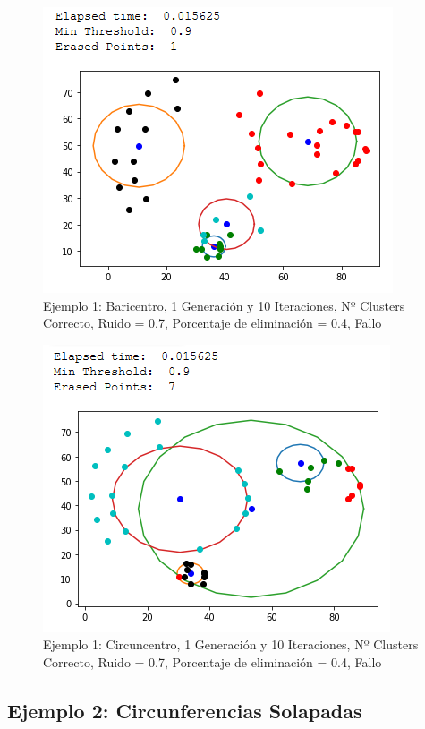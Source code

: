 \documentclass[conference,a4paper]{IEEEtran}
\begin{document}
\begin{figure}[H]
\centering
\includegraphics[scale=0.65]{Experimentacion/Ejemplo1/ej1_b_1_10_re}
\caption{Ejemplo 1: Baricentro, 1 Generación y 10 Iteraciones,  Nº Clusters Correcto, Ruido = 0.7, Porcentaje de eliminación = 0.4, Fallo\\}
\end{figure}

\begin{figure}[H]
\centering
\includegraphics[scale=0.65]{Experimentacion/Ejemplo1/ej1_c_1_10_re_wrong}
\caption{Ejemplo 1: Circuncentro, 1 Generación y 10 Iteraciones,  Nº Clusters Correcto, Ruido = 0.7, Porcentaje de eliminación = 0.4, Fallo\\}
\end{figure}

\subsection{Ejemplo 2: Circunferencias Solapadas}
\end{document}
